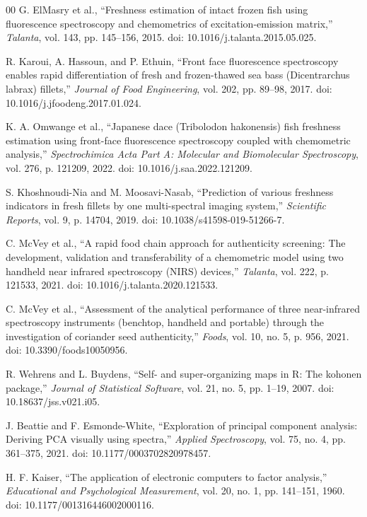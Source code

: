 \documentclass[conference]{IEEEtran}
\begin{document}
\begin{thebibliography}{00}
G. ElMasry et al., ``Freshness estimation of intact frozen fish using fluorescence spectroscopy and chemometrics of excitation-emission matrix,'' \textit{Talanta}, vol. 143, pp. 145--156, 2015. doi: 10.1016/j.talanta.2015.05.025.

R. Karoui, A. Hassoun, and P. Ethuin, ``Front face fluorescence spectroscopy enables rapid differentiation of fresh and frozen-thawed sea bass (Dicentrarchus labrax) fillets,'' \textit{Journal of Food Engineering}, vol. 202, pp. 89--98, 2017. doi: 10.1016/j.jfoodeng.2017.01.024.

K. A. Omwange et al., ``Japanese dace (Tribolodon hakonensis) fish freshness estimation using front-face fluorescence spectroscopy coupled with chemometric analysis,'' \textit{Spectrochimica Acta Part A: Molecular and Biomolecular Spectroscopy}, vol. 276, p. 121209, 2022. doi: 10.1016/j.saa.2022.121209.

S. Khoshnoudi-Nia and M. Moosavi-Nasab, ``Prediction of various freshness indicators in fresh fillets by one multi-spectral imaging system,'' \textit{Scientific Reports}, vol. 9, p. 14704, 2019. doi: 10.1038/s41598-019-51266-7.

C. McVey et al., ``A rapid food chain approach for authenticity screening: The development, validation and transferability of a chemometric model using two handheld near infrared spectroscopy (NIRS) devices,'' \textit{Talanta}, vol. 222, p. 121533, 2021. doi: 10.1016/j.talanta.2020.121533.

C. McVey et al., ``Assessment of the analytical performance of three near-infrared spectroscopy instruments (benchtop, handheld and portable) through the investigation of coriander seed authenticity,'' \textit{Foods}, vol. 10, no. 5, p. 956, 2021. doi: 10.3390/foods10050956.

R. Wehrens and L. Buydens, ``Self- and super-organizing maps in R: The kohonen package,'' \textit{Journal of Statistical Software}, vol. 21, no. 5, pp. 1--19, 2007. doi: 10.18637/jss.v021.i05.

J. Beattie and F. Esmonde-White, ``Exploration of principal component analysis: Deriving PCA visually using spectra,'' \textit{Applied Spectroscopy}, vol. 75, no. 4, pp. 361--375, 2021. doi: 10.1177/0003702820978457.

H. F. Kaiser, ``The application of electronic computers to factor analysis,'' \textit{Educational and Psychological Measurement}, vol. 20, no. 1, pp. 141--151, 1960. doi: 10.1177/001316446002000116.


\end{thebibliography}
\end{document}
